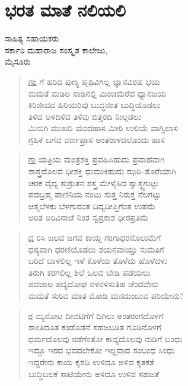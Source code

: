 \chapter{ಭರತ ಮಾತೆ ನಲಿಯಲಿ}

\begin{center}
\smallskip
ಸಾಹಿತ್ಯ ಸಹಾಯಕರು\\
ಸರ್ಕಾರಿ ಮಹಾರಾಜ ಸಂಸ್ಕೃತ ಕಾಲೇಜು,\\
ಮೈಸೂರು
\addrule
\end{center}
\begin{verse}
\underline{ಗಂ} ಗೆ 	ಹರಿದ 	ಪುಣ್ಯ ಪೃಥಿವಿಗಿಲ್ಲ 	ಜ್ಞಾನವಿರಹ 	ಭಯ\\
ಮಮತೆ ಮಡಿಲ ನಾಡಿನಲ್ಲಿ ಮಿಂಚಿಮೆರೆದ ಧ್ಯಾನಜಯ\\
ಕಿರಿಜೀವದ ಹಿರಿಯರಿವು ಬುದ್ಧನಂತ ಬುದ್ಧಿಯೊಡಲು\\
ತಿಳಿದ ಆಳದಿಳಿವ ತಿಳಿವು ಬಿತ್ತರದಿ ನೀಲ್ಗಡಲು\\
ಮಿನುಗಿ ಮುಖದಿ ಮಂದಹಾಸ ಮೀರಿ ಉಲಿಯೆ ವಾಗ್ವಿಲಾಸ\\
ಗ್ರಹಿಕೆ ಬಗೆವ ವರ್ಣಪ್ರಾಸ ಅಂತರಾಳದಲೊಂದು ಹಾಸ
\end{verse}
\begin{verse}
\underline{ಗಾ} ಯತ್ರಿಯ ಮಂತ್ರಶಕ್ತಿ ಪ್ರವಹಿಸಿಹುದು ಪ್ರವಾಹವಾಗಿ\\
ಶಾಸ್ತ್ರದೊಲವ ಧೀಶಕ್ತಿ ಧುಮುಕಿಹುದು ಝರಿ–ತೊರೆಯಾಗಿ\\
ಚರಕ ವೈದ್ಯ ಸುಶ್ರುತನ ಶಸ್ತ್ರ ಮೇಳೈಸಿದ ಸ್ವಾಸ್ಥ್ಯಗುಟ್ಟು\\
ಪದಬ್ರಹ್ಮ ಪಾಣಿನಿಯ ನಂಟು ಸುತ್ತ ನಿರುಕ್ತ ನೆಲಗಟ್ಟು\\
ಆತ್ಮಬೆಳಕು ಬೆಳಗುವಂತ ದಿವ್ಯದೀಪ್ತಿಗೆಂತ ಉಪಮೆ\\
ಅರಿತ ಅರಿವಿನಾಚೆ ನಿಂತ ಸ್ವಪ್ರಕಾಶ ಧೀರಪ್ರತಿಮೆ
\end{verse}
\begin{verse}
\underline{ಧ} ರಿಸಿ ಜಲವ ಜಗವ ಕಾಯ್ದ ಗಂಗಾಧರನೊಲುಮೆಗೆ\\
ಧನ್ಯವಾಗಿ ಧರಣಿಯೊಡಲು ಶಯನವಾಯ್ತು ಸುಮತಿಗೆ\\
ಬರಿದೆ ಬಾಳಲಿಲ್ಲ ಇಳೆ ಕೊಳೆಯ ತೊಳೆದು ಹೊಳೆದಳು\\
ತಿರುಗಿ ಕರಗಲಿಲ್ಲ ಶಿಲೆ ಒಲವ ಬೇಡಿ ಪಡೆಯಲು\\
ಪದಜಾಲ ಪದ್ಯದೋಘ ನಳನಳಿಸುತಿಹ ಚೆಂದವೇನು\\
ಮಮತೆ ಸುರಿವ ಮಾತ ಮೋಡಿ ಮನದುಂಬುವ ಪರಿಯೇನು?
\end{verse}
\begin{verse}
\underline{ರ} ಮ್ಯನೋಟ ದೀವಟಿಗೆಗೆ ದಿಗಿಲು ಅಂತರಂಗದೊಳಗೆ\\
ಶಾಂತಿದೂತ ಕಂಡೊಡನೆ ಸಹಜಬಡಿತ ಗೂಡಿನೊಳಗೆ\\
ಧರ್ಮದೊಲವು ನಡೆಗೆಂತೋ ಕಾವ್ಯದೊಲವು ನುಡಿಗೆ ಬಂಧು\\
ಇದ್ದೂ ಇರದ ಭವದಲೇಕೋ ಇಲ್ಲವಾದ ಸಂಬಂಧ ಸಿಂಧು\\
ಇದ್ದರೇನು ಕಾಯ ಕೃಶದಿ ಉಳಿದೂ ಅಳಿವ ಕೃತಕತೆ\\
ಬುದ್ಧಿಬಲಕೆ ಸಾಟಿಯೇನು ಅಳಿದೂ ಉಳಿವ ಸಹಜತೆ
\end{verse}
